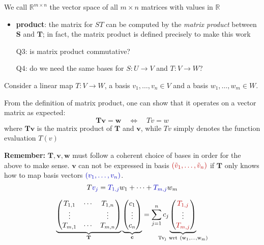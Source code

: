 {
We call $\mathbb{R}^{m\times n}$ the vector space of all $m\times n$ matrices with values in $\mathbb{R}$
}

{
\begin{itemize}
\item \textbf{product}: the matrix for $ST$ can be computed by the \emph{matrix product} between $\mathbf{S}$ and $\mathbf{T}$; in fact, the matrix product is defined precisely to make this work

{
Q3: is matrix product commutative?
}

{
Q4: do we need the same bases for $S:U\to V$ and $T:V \to W$?
}

\end{itemize}
}



Consider a linear map $T:V \to W$, a basis $v_1,\dots,v_n \in V$ and a basis $w_1,\dots,w_m\in W$.



From the definition of matrix product, one can show that it operates on a vector matrix as expected:
\[
\mathbf{Tv} =\mathbf{w} \quad \Leftrightarrow \quad Tv=w
\]
where $\mathbf{Tv}$ is the matrix product of $\mathbf{T}$ and $\mathbf{v}$, while $Tv$ simply denotes the function evaluation $T(v)$


{
\textbf{Remember:} $\mathbf{T}, \mathbf{v}, \mathbf{w}$ must follow a coherent choice of bases in order for the above to make sense. $\mathbf{v}$ can not be expressed in basis $\color{red}(\tilde{v}_1,\dots,\tilde{v}_n)$ if $\mathbf{T}$ only knows how to map basis vectors $\color{blue}({v}_1,\dots,{v}_n)$.
%
\[
T{\color{blue}v_j} = {\color{blue}T_{1,j}} w_1 + \cdots + {\color{blue}T_{m,j}} w_m
\]
%
}


\[
\underbrace{
\begin{pmatrix}
    T_{1,1} & \cdots & T_{1,n} \\
    \vdots & & \vdots\\
    T_{m,1} & \cdots & T_{m,n}
  \end{pmatrix}}_{\mathbf{T}}
  \underbrace{
  \begin{pmatrix}
    c_1 \\
    \vdots \\
    c_n
  \end{pmatrix}}_{\mathbf{c}} =
   \sum_{j=1}^n c_j \hspace{-0.6cm}
   \underbrace{\begin{pmatrix}
    {\color{red}T_{1,j}}  \\
    \vdots \\
    {\color{red}T_{m,j}}
  \end{pmatrix}}_{\mathrm{Tv_j~wrt~(w_1,\dots,w_m)}}
\]
%
\smallskip

